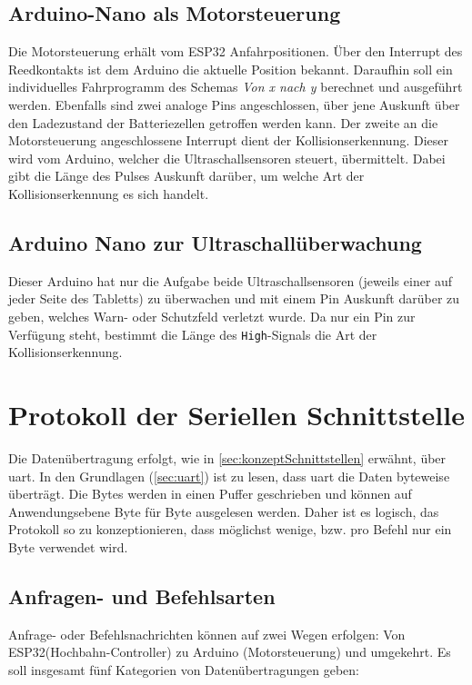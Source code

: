 \subsection{Arduino-Nano als Motorsteuerung}
\label{sec:aufgabeArduinoNanoMotor}
Die Motorsteuerung erhält vom ESP32 Anfahrpositionen. Über den Interrupt des Reedkontakts ist dem Arduino die aktuelle Position bekannt. Daraufhin soll ein individuelles Fahrprogramm des Schemas \textit{Von x nach y} berechnet und ausgeführt werden. Ebenfalls sind zwei analoge Pins angeschlossen, über jene Auskunft über den Ladezustand der Batteriezellen getroffen werden kann. Der zweite an die Motorsteuerung angeschlossene Interrupt dient der Kollisionserkennung. Dieser wird vom Arduino, welcher die Ultraschallsensoren steuert, übermittelt. Dabei gibt die Länge des Pulses Auskunft darüber, um welche Art der Kollisionserkennung es sich handelt.

\subsection{Arduino Nano zur Ultraschallüberwachung} 
\label{sec:aufgabeArduinoNanoUltraschall}
Dieser Arduino hat nur die Aufgabe beide Ultraschallsensoren (jeweils einer auf jeder Seite des Tabletts) zu überwachen und mit einem Pin Auskunft darüber zu geben, welches Warn- oder Schutzfeld verletzt wurde. Da nur ein Pin zur Verfügung steht, bestimmt die Länge des \texttt{High}-Signals die Art der Kollisionserkennung.
\newpage
\section{Protokoll der Seriellen Schnittstelle}
Die Datenübertragung erfolgt, wie in \autoref{sec:konzeptSchnittstellen} erwähnt, über \acrshort{uart}. In den Grundlagen (\autoref{sec:uart}) ist zu lesen, dass \acrshort{uart} die Daten byteweise überträgt. Die Bytes werden in einen Puffer geschrieben und können auf Anwendungsebene Byte für Byte ausgelesen werden. Daher ist es logisch, das Protokoll so zu konzeptionieren, dass möglichst wenige, bzw. pro Befehl nur ein Byte verwendet wird. 

\subsection{Anfragen- und Befehlsarten}
Anfrage- oder Befehlsnachrichten können auf zwei Wegen erfolgen: Von ESP32(Hochbahn-Controller) zu Arduino (Motorsteuerung) und umgekehrt. Es soll insgesamt fünf Kategorien von Datenübertragungen geben:

